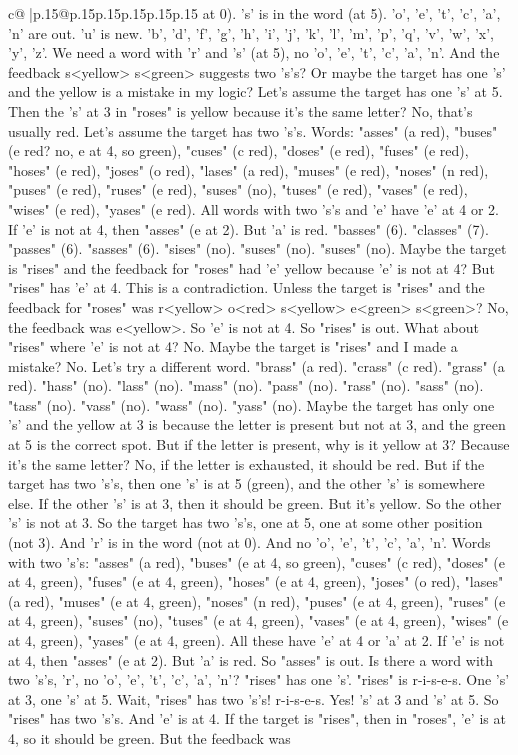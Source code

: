 \documentclass{article}
\begin{document}
{\begin{supertabular}{c@{$\;$}|p{.15\linewidth}@{}p{.15\linewidth}p{.15\linewidth}p{.15\linewidth}p{.15\linewidth}p{.15\linewidth}}
{{{at 0). 's' is in the word (at 5). 'o', 'e', 't', 'c', 'a', 'n' are out. 'u' is new. 'b', 'd', 'f', 'g', 'h', 'i', 'j', 'k', 'l', 'm', 'p', 'q', 'v', 'w', 'x', 'y', 'z'. We need a word with 'r' and 's' (at 5), no 'o', 'e', 't', 'c', 'a', 'n'. And the feedback s<yellow> s<green> suggests two 's's? Or maybe the target has one 's' and the yellow is a mistake in my logic? Let's assume the target has one 's' at 5. Then the 's' at 3 in "roses" is yellow because it's the same letter? No, that's usually red. Let's assume the target has two 's's. Words: "asses" (a red), "buses" (e red? no, e at 4, so green), "cuses" (c red), "doses" (e red), "fuses" (e red), "hoses" (e red), "joses" (o red), "lases" (a red), "muses" (e red), "noses" (n red), "puses" (e red), "ruses" (e red), "suses" (no), "tuses" (e red), "vases" (e red), "wises" (e red), "yases" (e red). All words with two 's's and 'e' have 'e' at 4 or 2. If 'e' is not at 4, then "asses" (e at 2). But 'a' is red. "basses" (6). "classes" (7). "passes" (6). "sasses" (6). "sises" (no). "suses" (no). "suses" (no). Maybe the target is "rises" and the feedback for "roses" had 'e' yellow because 'e' is not at 4? But "rises" has 'e' at 4. This is a contradiction. Unless the target is "rises" and the feedback for "roses" was r<yellow> o<red> s<yellow> e<green> s<green>? No, the feedback was e<yellow>. So 'e' is not at 4. So "rises" is out. What about "rises" where 'e' is not at 4? No. Maybe the target is "rises" and I made a mistake? No. Let's try a different word. "brass" (a red). "crass" (c red). "grass" (a red). "hass" (no). "lass" (no). "mass" (no). "pass" (no). "rass" (no). "sass" (no). "tass" (no). "vass" (no). "wass" (no). "yass" (no). Maybe the target has only one 's' and the yellow at 3 is because the letter is present but not at 3, and the green at 5 is the correct spot. But if the letter is present, why is it yellow at 3? Because it's the same letter? No, if the letter is exhausted, it should be red. But if the target has two 's's, then one 's' is at 5 (green), and the other 's' is somewhere else. If the other 's' is at 3, then it should be green. But it's yellow. So the other 's' is not at 3. So the target has two 's's, one at 5, one at some other position (not 3). And 'r' is in the word (not at 0). And no 'o', 'e', 't', 'c', 'a', 'n'. Words with two 's's: "asses" (a red), "buses" (e at 4, so green), "cuses" (c red), "doses" (e at 4, green), "fuses" (e at 4, green), "hoses" (e at 4, green), "joses" (o red), "lases" (a red), "muses" (e at 4, green), "noses" (n red), "puses" (e at 4, green), "ruses" (e at 4, green), "suses" (no), "tuses" (e at 4, green), "vases" (e at 4, green), "wises" (e at 4, green), "yases" (e at 4, green). All these have 'e' at 4 or 'a' at 2. If 'e' is not at 4, then "asses" (e at 2). But 'a' is red. So "asses" is out. Is there a word with two 's's, 'r', no 'o', 'e', 't', 'c', 'a', 'n'? "rises" has one 's'. "rises" is r{-}i{-}s{-}e{-}s. One 's' at 3, one 's' at 5. Wait, "rises" has two 's's! r{-}i{-}s{-}e{-}s. Yes! 's' at 3 and 's' at 5. So "rises" has two 's's. And 'e' is at 4. If the target is "rises", then in "roses", 'e' is at 4, so it should be green. But the feedback was }}}
\end{supertabular}}
\end{document}
